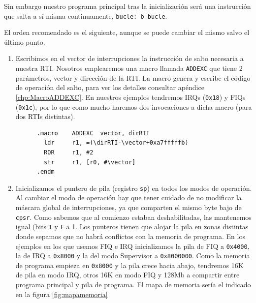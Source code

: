 Sin embargo nuestro programa principal tras la inicialización será una
instrucción que salta a sí misma continuamente, {\tt bucle: b bucle}.

El orden recomendado es el siguiente, aunque se puede cambiar el mismo salvo el último punto.

\begin{enumerate}
  \item Escribimos en el vector de interrupciones la instrucción de salto necesaria a nuestra RTI.
        Nosotros emplearemos una macro llamada {\tt ADDEXC} que tiene 2 parámetros, vector y
        dirección de la RTI. La macro genera y escribe el código de operación
        del salto, para ver los detalles consultar apéndice \ref{chp:MacroADDEXC}.
        En nuestros ejemplos tendremos IRQs ({\tt 0x18}) y FIQs ({\tt 0x1c}), por
        lo que como mucho haremos dos invocaciones a dicha macro (para dos RTIs distintas).
\begin{lstlisting}
      .macro    ADDEXC  vector, dirRTI
        ldr     r1, =(\dirRTI-\vector+0xa7fffffb)
        ROR     r1, #2
        str     r1, [r0, #\vector]
      .endm
\end{lstlisting}
  \item Inicializamos el puntero de pila (registro {\tt sp}) en todos los modos de operación.
        Al cambiar el modo de operación hay que tener cuidado de no modificar la máscara
        global de interrupciones, ya que comparten el mismo byte bajo de {\tt cpsr}. Como
        sabemos que al comienzo estaban deshabilitadas, las mantenemos igual (bits {\tt I}
        y {\tt F} a 1.
        Los punteros tienen que alojar la pila en zonas distintas donde sepamos que no
        habrá conflictos con la memoria de programa. En los ejemplos en los que usemos FIQ e
        IRQ inicializamos la pila de FIQ
        a {\tt 0x4000}, la de IRQ a {\tt 0x8000} y la del modo Supervisor a {\tt 0x8000000}.
        Como la memoria de programa empieza en {\tt 0x8000} y la pila crece hacia abajo,
        tendremos 16K de pila en modo IRQ, otros 16K en modo FIQ y 128Mb a compartir entre
        programa principal y pila de programa. El mapa de memoria sería el indicado en la figura
        \ref{fig:mapamemoria}


\end{enumerate}
